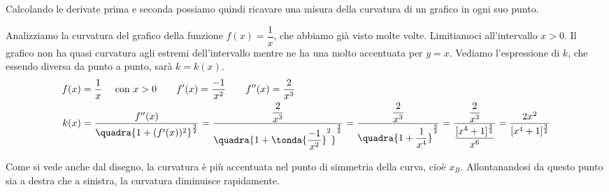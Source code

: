 Calcolando le derivate prima e seconda possiamo quindi ricavare 
una misura della curvatura di un grafico in ogni suo punto. 
\begin{esempio}
Analizziamo la curvatura del grafico della funzione \(f(x)=\dfrac{1}{x}\), che 
abbiamo già visto molte volte. Limitiamoci all'intervallo \(x>0\). Il grafico 
non ha quasi curvatura agli estremi dell'intervallo mentre ne ha una molto 
accentuata per \(y=x\). Vediamo l'espressione di \(k\), che essendo diversa da 
punto a punto, sarà \(k=k(x)\).
\begin{align*}
 f(x) &= \dfrac{1}{x}\quad \text{ con } x>0 \qquad f'(x)=\dfrac{-1}{x^2}\qquad 
f''(x)=\dfrac{2}{x^3}\\
k(x)&=\dfrac{f''(x)}{\quadra{1+(f'(x))^2}^{\frac{3}{2}}}=
\dfrac{\dfrac{2}{x^3}}{\quadra{1+\tonda{\dfrac{-1}{x^2}}^2}^{\frac{3}{2}}}=
\dfrac{\dfrac{2}{x^3}}{\quadra{1+\dfrac{1}{x^4}}^{\frac{3}{2}}}=
\dfrac{\dfrac{2}{x^3}}{\dfrac{[x^4+1]^\frac{3}{2}}{x^6}}=
\dfrac{2x^2}{[x^4+1]^\frac{3}{2}}
\end{align*}

Come si vede anche dal disegno, la curvatura è più accentuata nel punto di 
simmetria della curva, cioè \(x_B\). Allontanandosi da questo punto sia a 
destra che a sinistra, la curvatura diminuisce rapidamente.
\end{esempio}


